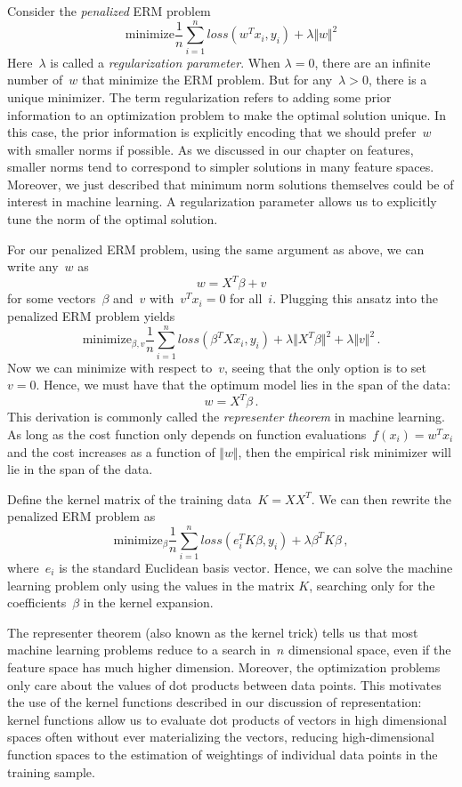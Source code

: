 \documentclass{tufte-book}
\begin{document}
Consider the \emph{penalized} ERM problem \[
    \text{minimize} \frac{1}{n} \sum_{i=1}^n \mathit{loss}(w^T x_i, y_i) + \lambda \Vert w\Vert^2
\] Here~\(\lambda\) is called a \emph{regularization parameter}. When
\(\lambda=0\), there are an infinite number of~\(w\) that minimize the
ERM problem. But for any~\(\lambda>0\), there is a unique minimizer. The
term regularization refers to adding some prior information to an
optimization problem to make the optimal solution unique. In this case,
the prior information is explicitly encoding that we should prefer~\(w\)
with smaller norms if possible. As we discussed in our chapter on
features, smaller norms tend to correspond to simpler solutions in many
feature spaces. Moreover, we just described that minimum norm solutions
themselves could be of interest in machine learning. A regularization
parameter allows us to explicitly tune the norm of the optimal solution.

For our penalized ERM problem, using the same argument as above, we can
write any~\(w\) as \[
    w = X^T \beta + v
\] for some vectors~\(\beta\) and~\(v\) with~\(v^Tx_i=0\) for all~\(i\).
Plugging this ansatz into the penalized ERM problem yields \[
    \text{minimize}_{\beta,v} \frac{1}{n} \sum_{i=1}^n \mathit{loss}(\beta^T X x_i,y_i) + \lambda \Vert X^T \beta \Vert^2 + \lambda \Vert v\Vert^2\,.
\] Now we can minimize with respect to~\(v\), seeing that the only
option is to set~\(v=0\). Hence, we must have that the optimum model
lies in the span of the data: \[
    w = X^T \beta \,.
\] This derivation is commonly called the \emph{representer theorem} in
machine learning. As long as the cost function only depends on function
evaluations~\(f(x_i)=w^Tx_i\) and the cost increases as a function of
\(\Vert w\Vert\), then the empirical risk minimizer will lie in the span
of the data.

Define the kernel matrix of the training data~\(K = XX^T\). We can then
rewrite the penalized ERM problem as \[
    \text{minimize}_{\beta} \frac{1}{n} \sum_{i=1}^n \mathit{loss}(e_i^T K\beta,y_i) + \lambda \beta^T K \beta\,,
\] where~\(e_i\) is the standard Euclidean basis vector. Hence, we can
solve the machine learning problem only using the values in the matrix
\(K\), searching only for the coefficients~\(\beta\) in the kernel
expansion.

The representer theorem (also known as the kernel trick) tells us that
most machine learning problems reduce to a search in~\(n\) dimensional
space, even if the feature space has much higher dimension. Moreover,
the optimization problems only care about the values of dot products
between data points. This motivates the use of the kernel functions
described in our discussion of representation: kernel functions allow us
to evaluate dot products of vectors in high dimensional spaces often
without ever materializing the vectors, reducing high-dimensional
function spaces to the estimation of weightings of individual data
points in the training sample.
\end{document}
